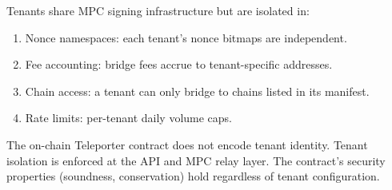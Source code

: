 \begin{property}
Tenants share MPC signing infrastructure but are isolated in:
\begin{enumerate}[nosep]
  \item Nonce namespaces: each tenant's nonce bitmaps are independent.
  \item Fee accounting: bridge fees accrue to tenant-specific addresses.
  \item Chain access: a tenant can only bridge to chains listed in its manifest.
  \item Rate limits: per-tenant daily volume caps.
\end{enumerate}
\end{property}

The on-chain Teleporter contract does not encode tenant identity. Tenant isolation is enforced at the API and MPC relay layer. The contract's security properties (soundness, conservation) hold regardless of tenant configuration.

